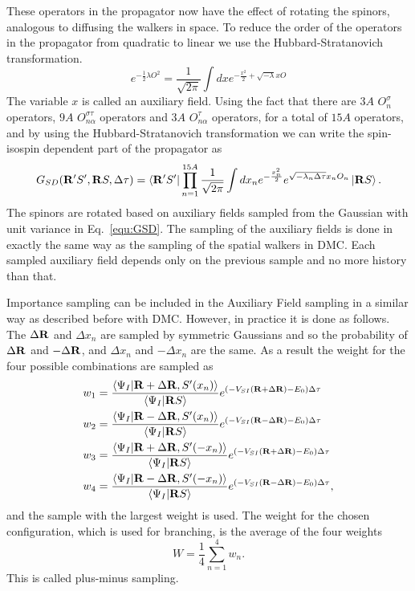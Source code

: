 These operators in the propagator now have the effect of rotating the spinors, analogous to diffusing the walkers in space. To reduce the order of the operators in the propagator from quadratic to linear we use the Hubbard-Stratanovich transformation.
\begin{equation}
   e^{-\frac{1}{2}\lambda O^2} = \frac{1}{\sqrt{2\pi}} \int dx e^{-\frac{x^2}{2} + \sqrt{-\lambda}x O}
\end{equation}
The variable $x$ is called an auxiliary field. Using the fact that there are $3A$ $O_{n}^{\sigma}$ operators, $9A$ $O_{n\alpha}^{\sigma\tau}$ operators and $3A$ $O_{n\alpha}^{\tau}$ operators, for a total of $15A$ operators, and by using the Hubbard-Stratanovich transformation we can write the spin-isospin dependent part of the propagator as
\begin{equation}
   G_{SD}(\mathbf{R}'S',\mathbf{R} S,\Delta\tau) = \left< \mathbf{R}'S' \right|\prod\limits_{n=1}^{15A}\frac{1}{\sqrt{2\pi}}\int dx_n e^{-\frac{x_n^2}{2}}e^{\sqrt{-\lambda_n\Delta\tau} x_nO_n}\left| \mathbf{R} S \right>.
   \label{equ:GSD}
\end{equation}
The spinors are rotated based on auxiliary fields sampled from the Gaussian with unit variance in Eq.~\ref{equ:GSD}. The sampling of the auxiliary fields is done in exactly the same way as the sampling of the spatial walkers in DMC. Each sampled auxiliary field depends only on the previous sample and no more history than that.

Importance sampling can be included in the Auxiliary Field sampling in a similar way as described before with DMC. However, in practice it is done as follows. The $\Delta \mathbf{R}$ and $\Delta x_n$ are sampled by symmetric Gaussians and so the probability of $\Delta \mathbf{R}$ and $-\Delta \mathbf{R}$, and $\Delta x_n$ and $-\Delta x_n$ are the same. As a result the weight for the four possible combinations are sampled as
\begin{align}
   w_1 &= \frac{\left< \Psi_I | \mathbf{R}+\Delta \mathbf{R}, S'(x_n) \right>}{\left< \Psi_I | \mathbf{R} S \right>} e^{\left(-V_{SI}(\mathbf{R}+\Delta\mathbf{R}) - E_0\right)\Delta\tau} \\
   w_2 &= \frac{\left< \Psi_I | \mathbf{R}-\Delta \mathbf{R}, S'(x_n) \right>}{\left< \Psi_I | \mathbf{R} S \right>} e^{\left(-V_{SI}(\mathbf{R}-\Delta\mathbf{R}) - E_0\right)\Delta\tau} \\
   w_3 &= \frac{\left< \Psi_I | \mathbf{R}+\Delta \mathbf{R}, S'(-x_n) \right>}{\left< \Psi_I | \mathbf{R} S \right>} e^{\left(-V_{SI}(\mathbf{R}+\Delta\mathbf{R}) - E_0\right)\Delta\tau} \\
   w_4 &= \frac{\left< \Psi_I | \mathbf{R}-\Delta \mathbf{R}, S'(-x_n) \right>}{\left< \Psi_I | \mathbf{R} S \right>} e^{\left(-V_{SI}(\mathbf{R}-\Delta\mathbf{R}) - E_0\right)\Delta\tau},
\end{align}
and the sample with the largest weight is used. The weight for the chosen configuration, which is used for branching, is the average of the four weights
\begin{equation}
   W = \frac{1}{4}\sum\limits_{n=1}^4 w_n.
\end{equation}
This is called plus-minus sampling.

